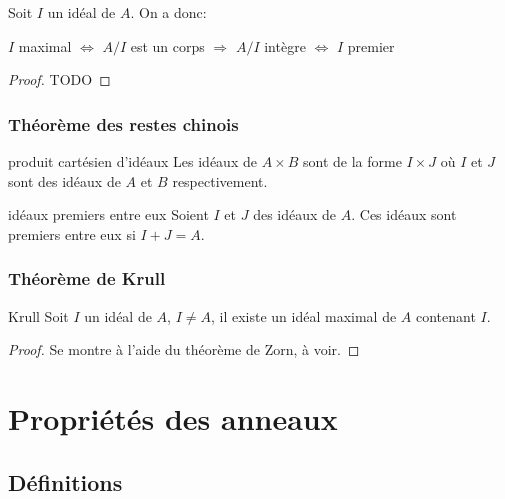 \begin{proposition}{}{}
    Soit $I$ un idéal de $A$. On a donc:
    \begin{center}
        $I$ maximal $\Longleftrightarrow$ $A/I$ est un corps $\Longrightarrow$ $A/I$ intègre $\Longleftrightarrow$ $I$ premier
    \end{center}
\end{proposition}

\begin{proof}
    TODO
\end{proof}

\subsubsection{Théorème des restes chinois}

\begin{proposition}{produit cartésien d'idéaux}{}
    Les idéaux de $A \times B$ sont de la forme $I \times J$ 
    où $I$ et $J$ sont des idéaux de $A$ et $B$ respectivement. 
\end{proposition}

\begin{proposition}{idéaux premiers entre eux}{}
    Soient $I$ et $J$ des idéaux de $A$. Ces idéaux sont premiers entre eux si $I + J = A$.
    
\end{proposition}

\subsubsection{Théorème de Krull}

\begin{theorem}{Krull}{}
    Soit $I$ un idéal de $A$, $I \neq A$, il existe un idéal maximal de $A$ contenant $I$.
\end{theorem}

\begin{proof}
    Se montre à l'aide du théorème de Zorn, à voir.
\end{proof}



\newpage

\section{Propriétés des anneaux}

\subsection{Définitions}

